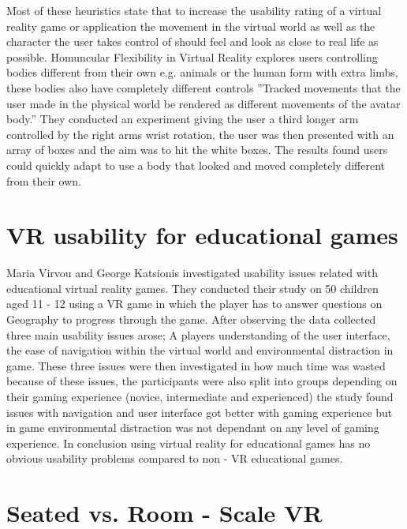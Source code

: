 \documentclass{scrartcl}
\begin{document}
Most of these heuristics state that to increase the usability rating of a virtual reality game or application the movement in the virtual world as well as the character the user takes control of should feel and look as close to real life as possible. Homuncular Flexibility in Virtual Reality\cite{won2015homuncular} explores users controlling bodies different from their own e.g. animals or the human form with extra limbs, these bodies also have completely different controls ''Tracked movements that the user made in the physical world be rendered as different movements of the avatar body.'' They conducted an experiment giving the user a third longer arm controlled by the right arms wrist rotation, the user was then presented with an array of boxes and the aim was to hit the white boxes. The results found users could quickly adapt to use a body that looked and  moved completely different from their own.

\section*{VR usability for educational games}

Maria Virvou and George Katsionis investigated usability issues related with educational virtual reality games\cite{virvouusability}. They conducted their study on 50 children aged 11 - 12 using a VR game in which the player has to answer questions on Geography to progress through the game. After observing the data collected three main usability issues arose; A players understanding of the user interface, the ease of navigation within the virtual world and environmental distraction in game. These three issues were then investigated in how much time was wasted because of these issues, the participants were also split into groups depending on their gaming experience (novice, intermediate and experienced) the study found issues with navigation and user interface got better with gaming experience but in game environmental distraction was not dependant on any level of gaming experience. In conclusion using virtual reality for educational games has no obvious usability problems compared to non - VR educational games.

\section*{Seated vs. Room - Scale VR}
\end{document}
